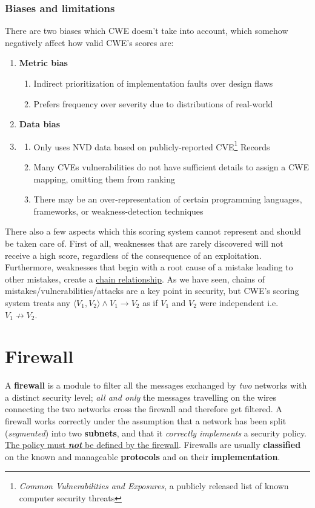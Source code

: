 \subsubsection{Biases and limitations}
There are two biases which CWE doesn't take into account,
which somehow negatively affect how valid CWE's scores are:
\begin{enumerate}
   \item \textbf{Metric bias}
   \begin{enumerate}
      \item 
      Indirect prioritization of implementation faults over design flaws
      \item 
      Prefers frequency over severity due to distributions of real-world
   \end{enumerate}
   \item \textbf{Data bias}
   \item \begin{enumerate}
      \item Only uses NVD data based on publicly-reported CVE\footnote{\textit{Common Vulnerabilities and Exposures}, a publicly released list of known computer security threats} Records
      \item Many CVEs vulnerabilities do not have sufficient details to assign a CWE
      mapping, omitting them from ranking
      \item There may be an over-representation of certain programming
      languages, frameworks, or weakness-detection techniques
   \end{enumerate}
\end{enumerate} 

There also a few aspects which this scoring system cannot represent and should be taken care of.
First of all,
weaknesses that are rarely discovered will not receive a high score,
regardless of the consequence of an exploitation.
Furthermore, weaknesses that begin with a root cause of a mistake leading to
other mistakes, create a \ul{chain relationship}.
As we have seen, chains of mistakes/vulnerabilities/attacks are a key point in security,
but CWE's scoring system treats any $\langle V_1, V_2 \rangle \wedge V_1 \rightarrow V_2$ as if $V_1$ and $V_2$ were independent i.e. $V_1 \not\rightarrow V_2$.


\section{Firewall}
A \textbf{firewall} is a module to filter all the messages exchanged by \textit{two} networks with a distinct security level;
\textit{all and only} the messages travelling on the wires
connecting the two networks cross the firewall and therefore get filtered.
A firewall works correctly under the assumption that a network has been split (\textit{segmented}) into two \textbf{subnets}, 
and that it \textit{correctly implements} a security policy.
\ul{The policy must \textit{\textbf{not}} be defined by the firewall}.
Firewalls are usually \textbf{classified} on the known and manageable \textbf{protocols} and on their \textbf{implementation}.

